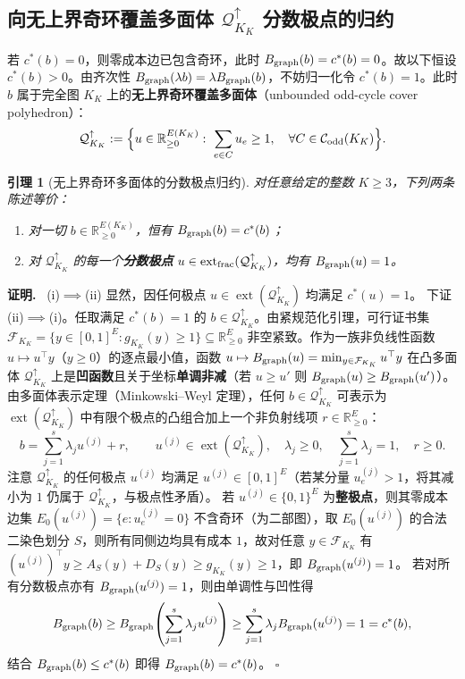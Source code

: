 \documentclass[11pt,a4paper]{ctexart}
\newtheorem{lemma}[theorem]{引理}
\theoremstyle{definition}
\newenvironment{proofcn}{\par\noindent\textbf{证明.}\ }{\hfill$\square$\par}
\newcommand{\Odd}{\mathcal C_{\rm odd}}
\newcommand{\RR}{\mathbb R}
\newcommand{\1}{\boldsymbol 1}
\newcommand{\0}{\boldsymbol 0}
\newcommand{\bgraph}{B_{\rm graph}}
\newcommand{\ct}{c^*}
\begin{document}
\subsection{向无上界奇环覆盖多面体 $\mathcal Q_{K_K}^{\uparrow}$ 分数极点的归约}
若 $\ct(b)=0$，则零成本边已包含奇环，此时 $\bgraph(b)=\ct(b)=0$。故以下恒设 $\ct(b)>0$。由齐次性 $\bgraph(\lambda b)=\lambda\bgraph(b)$，不妨归一化令 $\ct(b)=1$。此时 $b$ 属于完全图 $K_K$ 上的\textbf{无上界奇环覆盖多面体}（unbounded odd-cycle cover polyhedron）：
\begin{equation}\label{eq:Q_up}
 \mathcal Q_{K_K}^{\uparrow}:=\Bigl\{u\in\RR_{\ge 0}^{E(K_K)}:\ \sum_{e\in C}u_e\ge 1,\quad\forall C\in\Odd(K_K)\Bigr\}.
\end{equation}

\begin{lemma}[无上界奇环多面体的分数极点归约]\label{lem:extreme_reduction}
对任意给定的整数 $K\ge 3$，下列两条陈述等价：
\begin{enumerate}[label=(\roman*)]
\item 对一切 $b\in\RR_{\ge 0}^{E(K_K)}$，恒有 $\bgraph(b)=\ct(b)$；
\item 对 $\mathcal Q_{K_K}^{\uparrow}$ 的每一个\textbf{分数极点} $u\in\operatorname{ext}_{\rm frac}(\mathcal Q_{K_K}^{\uparrow})$，均有 $\bgraph(u)=1$。
\end{enumerate}
\end{lemma}
\begin{proofcn}
(i)$\implies$(ii) 显然，因任何极点 $u\in\operatorname{ext}(\mathcal Q_{K_K}^{\uparrow})$ 均满足 $\ct(u)=1$。
下证 (ii)$\implies$(i)。任取满足 $\ct(b)=1$ 的 $b\in\mathcal Q_{K_K}^{\uparrow}$。由紧规范化引理，可行证书集 $\mathcal F_{K_K}=\{y\in[0,1]^E:g_{K_K}(y)\ge 1\}\subseteq\RR_{\ge 0}^E$ 非空紧致。作为一族非负线性函数 $u\mapsto u^\top y$（$y\ge 0$）的逐点最小值，函数 $u\mapsto\bgraph(u)=\min_{y\in\mathcal F_{K_K}}u^\top y$ 在凸多面体 $\mathcal Q_{K_K}^{\uparrow}$ 上是\textbf{凹函数}且关于坐标\textbf{单调非减}（若 $u\ge u'$ 则 $\bgraph(u)\ge\bgraph(u')$）。
由多面体表示定理（Minkowski--Weyl 定理），任何 $b\in\mathcal Q_{K_K}^{\uparrow}$ 可表示为 $\operatorname{ext}(\mathcal Q_{K_K}^{\uparrow})$ 中有限个极点的凸组合加上一个非负射线项 $r\in\RR_{\ge 0}^E$：
\[
 b = \sum_{j=1}^s \lambda_j u^{(j)} + r,\qquad u^{(j)}\in\operatorname{ext}(\mathcal Q_{K_K}^{\uparrow}),\quad \lambda_j\ge 0,\quad \sum_{j=1}^s\lambda_j=1,\quad r\ge 0.
\]
注意 $\mathcal Q_{K_K}^{\uparrow}$ 的任何极点 $u^{(j)}$ 均满足 $u^{(j)}\in[0,1]^E$（若某分量 $u_e^{(j)}>1$，将其减小为 $1$ 仍属于 $\mathcal Q_{K_K}^{\uparrow}$，与极点性矛盾）。
若 $u^{(j)}\in\{0,1\}^E$ 为\textbf{整极点}，则其零成本边集 $E_0(u^{(j)})=\{e:u_e^{(j)}=0\}$ 不含奇环（为二部图），取 $E_0(u^{(j)})$ 的合法二染色划分 $S$，则所有同侧边均具有成本 $1$，故对任意 $y\in\mathcal F_{K_K}$ 有 $(u^{(j)})^\top y\ge A_S(y)+D_S(y)\ge g_{K_K}(y)\ge 1$，即 $\bgraph(u^{(j)})=1$。
若对所有分数极点亦有 $\bgraph(u^{(j)})=1$，则由单调性与凹性得
\[
 \bgraph(b)\ge \bgraph\!\left(\sum_{j=1}^s\lambda_j u^{(j)}\right)\ge \sum_{j=1}^s\lambda_j\bgraph(u^{(j)}) = 1 = \ct(b),
\]
结合 $\bgraph(b)\le\ct(b)$ 即得 $\bgraph(b)=\ct(b)$。
\end{proofcn}
\end{document}
